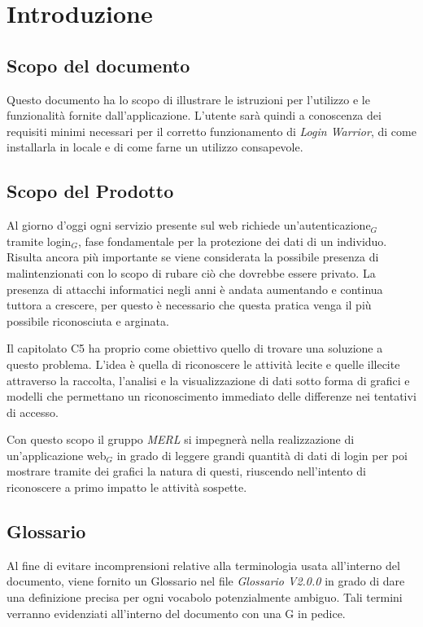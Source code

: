 \chapter{Introduzione}
\section{Scopo del documento}
Questo documento ha lo scopo di illustrare le istruzioni per l’utilizzo e le funzionalità fornite dall’applicazione. L’utente sarà quindi a conoscenza dei requisiti minimi necessari per il corretto funzionamento di \textit{Login Warrior}, di come installarla in locale e di come farne un utilizzo consapevole.
\section{Scopo del Prodotto}
Al giorno d'oggi ogni servizio presente sul web richiede un'autenticazione$_G$ tramite login$_G$, fase fondamentale per la protezione dei dati di un individuo. Risulta ancora più importante se viene considerata la possibile presenza di malintenzionati con lo scopo di rubare ciò che dovrebbe essere privato. La presenza di attacchi informatici negli anni è andata aumentando e continua tuttora a crescere, per questo è necessario che questa pratica venga il più possibile riconosciuta e arginata.

Il capitolato C5 ha proprio come obiettivo quello di trovare una soluzione a questo problema. L'idea è quella di riconoscere le attività lecite e quelle illecite attraverso la raccolta, l'analisi e la visualizzazione di dati sotto forma di grafici e modelli che permettano un riconoscimento immediato delle differenze nei tentativi di accesso.

Con questo scopo il gruppo \textit{MERL} si impegnerà nella realizzazione di un'applicazione web$_G$ in grado di leggere grandi quantità di dati di login per poi mostrare tramite dei grafici la natura di questi, riuscendo nell'intento di riconoscere a primo impatto le attività sospette.
\section{Glossario}
Al fine di evitare incomprensioni relative alla terminologia usata all'interno del documento, viene fornito un Glossario nel file \textit{Glossario V2.0.0} in grado di dare una definizione precisa per ogni vocabolo potenzialmente ambiguo. Tali termini verranno evidenziati all'interno del documento con una G in pedice.
